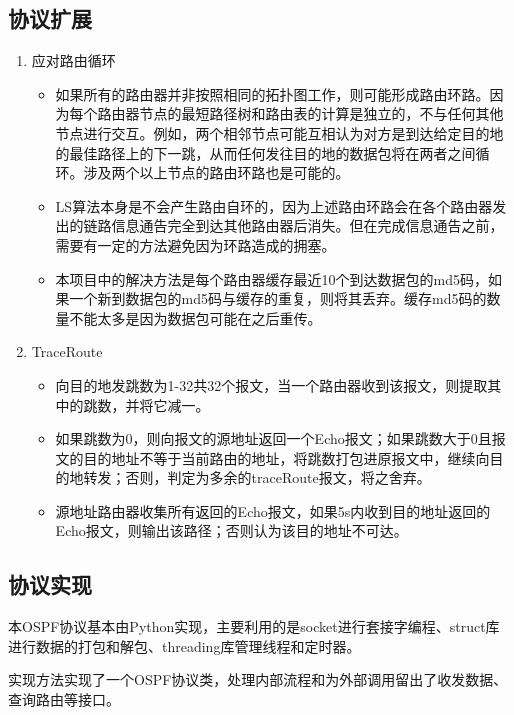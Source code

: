 	\subsection{协议扩展} %
	\label{sub:协议扩展}
		\begin{enumerate}
			\item 应对路由循环
				\begin{itemize}
					\item 如果所有的路由器并非按照相同的拓扑图工作，则可能形成路由环路。因为每个路由器节点的最短路径树和路由表的计算是独立的，不与任何其他节点进行交互。例如，两个相邻节点可能互相认为对方是到达给定目的地的最佳路径上的下一跳，从而任何发往目的地的数据包将在两者之间循环。涉及两个以上节点的路由环路也是可能的。
					\item LS算法本身是不会产生路由自环的，因为上述路由环路会在各个路由器发出的链路信息通告完全到达其他路由器后消失。但在完成信息通告之前，需要有一定的方法避免因为环路造成的拥塞。
					\item 本项目中的解决方法是每个路由器缓存最近10个到达数据包的md5码，如果一个新到数据包的md5码与缓存的重复，则将其丢弃。缓存md5码的数量不能太多是因为数据包可能在之后重传。
				\end{itemize}
			\item TraceRoute
				\begin{itemize}
					\item 向目的地发跳数为1-32共32个报文，当一个路由器收到该报文，则提取其中的跳数，并将它减一。
					\item 如果跳数为0，则向报文的源地址返回一个Echo报文；如果跳数大于0且报文的目的地址不等于当前路由的地址，将跳数打包进原报文中，继续向目的地转发；否则，判定为多余的traceRoute报文，将之舍弃。
					\item 源地址路由器收集所有返回的Echo报文，如果5s内收到目的地址返回的Echo报文，则输出该路径；否则认为该目的地址不可达。
				\end{itemize} 
		\end{enumerate}
	\subsection{协议实现} %
	\label{sub:协议实现}
		本OSPF协议基本由Python实现，主要利用的是socket进行套接字编程、struct库进行数据的打包和解包、threading库管理线程和定时器。
		\par 实现方法实现了一个OSPF协议类，处理内部流程和为外部调用留出了收发数据、查询路由等接口。
